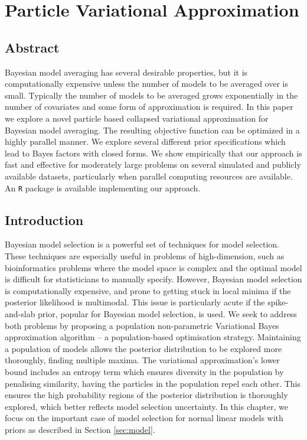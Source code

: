 \chapter{Particle Variational Approximation}


\section*{Abstract}

Bayesian model averaging  has several desirable properties, but it is
computationally expensive unless the number of models to be averaged  over is
small. Typically the number of models to be averaged grows exponentially in the
number of covariates and some form of approximation is required.  In this paper
we explore a novel particle based  collapsed variational approximation for
Bayesian model averaging.  The resulting objective function can be optimized in
a highly parallel manner.  We explore several different prior specifications
which lead to Bayes factors with closed forms.  We show empirically that our
approach is fast and effective for moderately large problems  on several
simulated and publicly available datasets, particularly when parallel computing
resources are available. An {\tt R} package is available implementing our
approach.

\newpage 

\section{Introduction}

Bayesian model selection is a powerful set of techniques for model selection.
These techniques are especially useful in problems of high-dimension, such as
bioinformatics problems where the model space is complex and the optimal model
is difficult for statisticians to manually specify. However, Bayesian model
selection is computationally expensive, and prone to getting stuck in local
minima if the posterior likelihood is multimodal. This issue is particularly
acute if the spike-and-slab prior, popular for Bayesian model selection, is
used. We seek to address both problems by proposing a population non-parametric
Variational Bayes approximation algorithm -- a population-based optimisation
strategy. Maintaining a population of models allows the posterior distribution
to be explored more thoroughly, finding multiple maxima. The variational
approximation's lower bound includes an entropy term which ensures diversity in
the population by penalising similarity,  having the particles in the
population repel each other. This ensures the high probability regions of the
posterior distribution is thoroughly explored, which better reflects model
selection uncertainty. In this chapter, we focus on the important case of model
selection for normal linear models with priors as described in Section
\ref{sec:model}.

